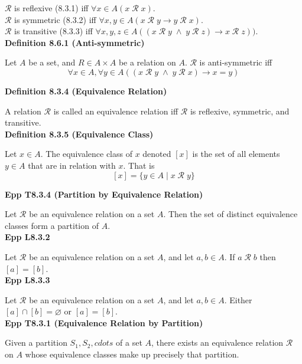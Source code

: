 \documentclass[a4paper]{article}
\newcommand{\subheading}[1]{{\scriptsize\textbf{#1}}}
\begin{document}
\begin{multicols*}{4}
$\mathcal{R}$ is reflexive (8.3.1) iff $\forall x \in A (x\;\mathcal{R}\;x)$.\\

$\mathcal{R}$ is symmetric (8.3.2) iff $\forall x, y \in A (x\;\mathcal{R}\;y
\rightarrow y\;\mathcal{R}\;x)$.\\

$\mathcal{R}$ is transitive (8.3.3) iff $\forall x, y, z \in A
((x\;\mathcal{R}\;y\;\land\;y\;\mathcal{R}\;z)\rightarrow x\;\mathcal{R}\;z))$.\\

\subheading{Definition 8.6.1 (Anti-symmetric)}

Let $A$ be a set, and $R \in A \times A$ be a relation on $A$. $\mathcal{R}$ is
anti-symmetric iff
$$\forall x \in A, \forall y \in A
  ((x\;\mathcal{R}\;y\;\land\;y\;\mathcal{R}\;x) \rightarrow x = y)$$

\subheading{Definition 8.3.4 (Equivalence Relation)}

A relation $\mathcal{R}$ is called an equivalence relation iff $\mathcal{R}$ is
reflexive, symmetric, and transitive.\\

\subheading{Definition 8.3.5 (Equivalence Class)}

Let $x \in A$. The equivalence class of $x$ denoted $[x]$ is the set of all
elements $y \in A$ that are in relation with $x$. That is
$$[x] = \{ y \in A\;|\; x\;\mathcal{R}\;y\}$$

\subheading{Epp T8.3.4 (Partition by Equivalence Relation)}

Let $\mathcal{R}$ be an equivalence relation on a set $A$. Then the set of
distinct equivalence classes form a partition of $A$.\\

\subheading{Epp L8.3.2}

Let $\mathcal{R}$ be an equivalence relation on a set $A$, and let $a, b \in A$.
If $a\;\mathcal{R}\;b$ then $[a]=[b]$.\\

\subheading{Epp L8.3.3}

Let $\mathcal{R}$ be an equivalence relation on a set $A$, and let $a, b \in A$.
Either $[a] \cap [b] = \varnothing$ or $[a] = [b]$.\\

\subheading{Epp T8.3.1 (Equivalence Relation by Partition)}

Given a partition $S_1, S_2, cdots$ of a set $A$, there exists an equivalence
relation $\mathcal{R}$ on $A$ whose equivalence classes make up precisely that
partition. \\


\end{multicols*}
\end{document}
